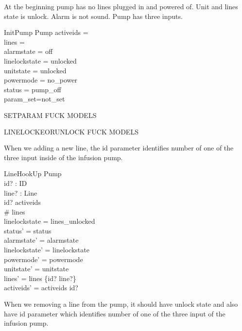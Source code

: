 \documentclass{article}
\begin{document}
	At the beginning pump has no lines plugged in and powered of.
	Unit and lines state is unlock. Alarm is not sound. 
	Pump has three inputs.	
	
	\begin{schema}{InitPump}
		Pump
		\where
		activeids = \emptyset \\
		lines = \emptyset \\
		alarmstate = off \\
		linelockstate = unlocked \\
		unitstate  = unlocked \\
		powermode =  no\_power \\
		status = pump\_off\\
		param\_set=not\_set	
	\end{schema}
	
	\begin{schema}{SETPARAM}
		FUCK MODELS
	\end{schema}

    \begin{schema}{LINELOCKEORUNLOCK}
		FUCK MODELS
	\end{schema} 
	When we adding a new line, the id parameter identifies number of 
	one of the three input inside of the infusion pump.

	\begin{schema}{LineHookUp}
		\Delta Pump \\
		id? : ID \\
		line? : Line \\
		\where
		id? \notin activeids\\
		\# lines  \\
		linelockstate = lines\_unlocked \\
		status' = status \\
		alarmstate' = alarmstate \\
		linelockstate' = linelockstate \\
		powermode' =  powermode \\
		unitstate' = unitstate \\
		lines' = lines \cup \{id? \mapsto line?\} \\
		activeids' = activeids \cup id?
	\end{schema}

	When we removing a line from the pump, it should have unlock state
	and also have id parameter which identifies number of one of the
	three input of the infusion pump.
	
\end{document}
